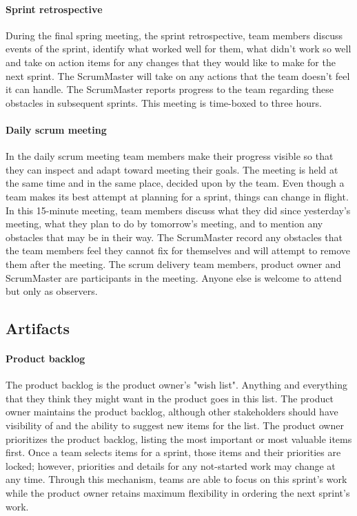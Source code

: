 \documentclass[11pt]{article}
\begin{document}
\paragraph{Sprint retrospective} During the final spring meeting, the sprint retrospective, team members discuss events of the sprint, identify what worked well for them, what didn't work so well and take on action items for any changes that they would like to make for the next sprint. The ScrumMaster will take on any actions that the team doesn't feel it can handle. The ScrumMaster reports progress to the team regarding these obstacles in subsequent sprints. This meeting is time-boxed to three hours.
\paragraph{Daily scrum meeting} In the daily scrum meeting team members make their progress visible so that they can inspect and adapt toward meeting their goals. The meeting is held at the same time and in the same place, decided upon by the team. Even  though a team makes its best attempt at planning for a sprint, things can change in flight. In this 15-minute meeting, team members discuss what they did since yesterday's meeting, what they plan to do by tomorrow's meeting, and to mention any obstacles that may be in their way. The ScrumMaster record any obstacles that the team members feel they cannot fix for themselves and will attempt to remove them after the meeting. The scrum delivery team members, product owner and ScrumMaster are participants in the meeting. Anyone else is welcome to attend but only as observers.
\subsection{Artifacts}
\paragraph{Product backlog} The product backlog is the product owner's "wish list". Anything and everything that they think they might want in the product goes in this list. The product owner maintains the product backlog, although other stakeholders should have visibility of and the ability to suggest new items for the list. The product owner prioritizes the product backlog, listing the most important or most valuable items first. Once a team selects items for a sprint, those items and their priorities are locked; however, priorities and details for any not-started work may change at any time. Through this mechanism, teams are able to focus on this sprint's work while the product owner retains maximum flexibility in ordering the next sprint's work.
\end{document}
